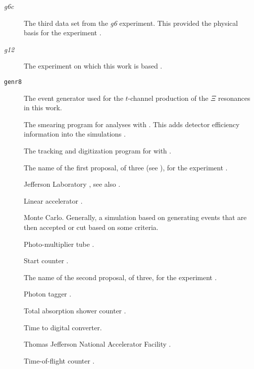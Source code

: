 \begin{description}
    \item[\textit{g6c}] The third data set from the \textit{g6}  experiment. This provided the physical basis for the  experiment .
    \item[\textit{g12}] The  experiment on which this work is based .
    \item[\texttt{genr8}] The event generator used for the $t$-channel production of the $\Xi$ resonances in this work.
    \item[] The smearing program for  analyses with . This adds detector efficiency information into the simulations .
    \item[] The tracking and digitization program for  with  .

    \item[] The name of the first proposal, of three (see ), for the  experiment .

    \item[] Jefferson Laboratory , see also .

    \item[] Linear accelerator .

    \item[] Monte Carlo. Generally, a simulation based on generating events that are then accepted or cut based on some criteria.

    \item[] Photo-multiplier tube .

    \item[] Start counter .
    \item[] The name of the second proposal, of three, for the  experiment .

    \item[] Photon tagger .
    \item[] Total absorption shower counter .
    \item[] Time to digital converter.
    \item[] Thomas Jefferson National Accelerator Facility .
    \item[] Time-of-flight counter .

\end{description}
